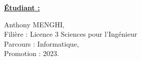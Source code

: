 \textbf{\underline{\Large Étudiant :}}
\begin{flushleft}
    \hspace{1cm} Anthony MENGHI, \\
    \hspace{1cm} Filière : Licence 3 Sciences pour l'Ingénieur \\
    \hspace{1cm} Parcours : Informatique, \\
    \hspace{1cm} Promotion : 2023. \\
\end{flushleft}
\vspace{0.8cm}